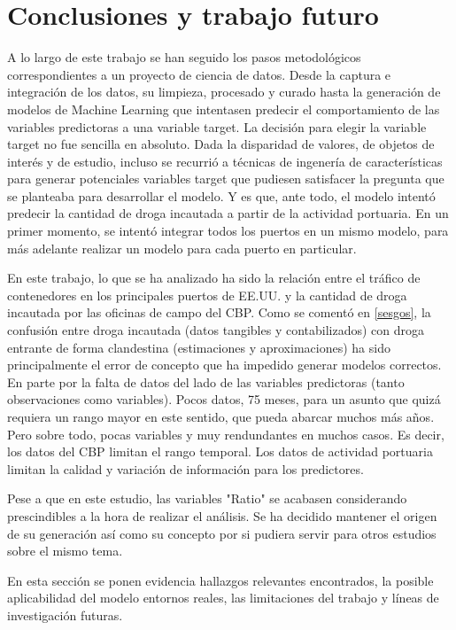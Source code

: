 \documentclass[12pt]{article}
\begin{document}
\section{\label{trabajo futuro}Conclusiones y trabajo futuro}
A lo largo de este trabajo se han seguido los pasos metodológicos correspondientes a un proyecto de ciencia de datos. Desde la captura e integración de los datos, su limpieza, procesado y curado hasta la generación de modelos de Machine Learning que intentasen predecir el comportamiento de las variables predictoras a una variable target. La decisión para elegir la variable target no fue sencilla en absoluto. Dada la disparidad de valores, de objetos de interés y de estudio, incluso se recurrió a técnicas de ingenería de características para generar potenciales variables target que pudiesen satisfacer la pregunta que se planteaba para desarrollar el modelo. Y es que, ante todo, el modelo intentó predecir la cantidad de droga incautada a partir de la actividad portuaria. En un primer momento, se intentó integrar todos los puertos en un mismo modelo, para más adelante realizar un modelo para cada puerto en particular.

En este trabajo, lo que se ha analizado ha sido la relación entre el tráfico de contenedores en los principales puertos de EE.UU. y la cantidad de droga incautada por las oficinas de campo del CBP. Como se comentó en \ref{sesgos}, la confusión entre droga incautada (datos tangibles y contabilizados) con droga entrante de forma clandestina (estimaciones y aproximaciones) ha sido principalmente el error de concepto que ha impedido generar modelos correctos. En parte por la falta de datos del lado de las variables predictoras (tanto observaciones como variables). Pocos datos, 75 meses, para un asunto que quizá requiera un rango mayor en este sentido, que pueda abarcar muchos más años. Pero sobre todo, pocas variables y muy rendundantes en muchos casos. Es decir, los datos del CBP limitan el rango temporal. Los datos de actividad portuaria limitan la calidad y variación de información para los predictores.

Pese a que en este estudio, las variables "Ratio" se acabasen considerando prescindibles a la hora de realizar el análisis. Se ha decidido mantener el origen de su generación así como su concepto por si pudiera servir para otros estudios sobre el mismo tema.

En esta sección se ponen evidencia hallazgos relevantes encontrados, la posible aplicabilidad del modelo entornos reales, las limitaciones del trabajo y líneas de investigación futuras.
\end{document}
